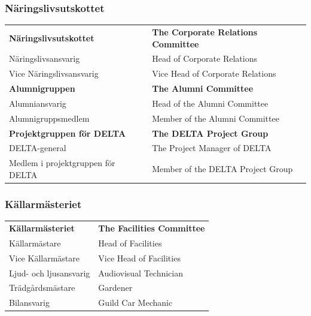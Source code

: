 \documentclass{dsekprotokoll}
\begin{document}
\subsubsection*{Näringslivsutskottet}
\vspace{12pt}
\begin{center}
    \begin{tabular}{R{7.4cm}|L{7.4cm}}
        \textbf{Näringslivsutskottet} & \textbf{The Corporate Relations Committee}\\
        Näringslivsansvarig & Head of Corporate Relations\\
        Vice Näringslivsansvarig & Vice Head of Corporate Relations\\

        \textbf{Alumnigruppen} & \textbf{The Alumni Committee}\\
        Alumniansvarig & Head of the Alumni Committee\\
        Alumnigruppsmedlem & Member of the Alumni Committee\\

        \textbf{Projektgruppen för DELTA} & \textbf{The DELTA Project Group}\\
        DELTA-general & The Project Manager of DELTA\\
        Medlem i projektgruppen för DELTA & Member of the DELTA Project Group
    \end{tabular}
\end{center}

\subsubsection*{Källarmästeriet}
\vspace{12pt}
\begin{center}
    \begin{tabular}{R{6.5cm}|L{6.5cm}}
        \textbf{Källarmästeriet} & \textbf{The Facilities Committee}\\
        Källarmästare & Head of Facilities\\
        Vice Källarmästare & Vice Head of Facilities\\
        Ljud- och ljusansvarig & Audiovisual Technician\\
        Trädgårdsmästare & Gardener\\
        Bilansvarig & Guild Car Mechanic\\
    \end{tabular}
\end{center}
\end{document}
